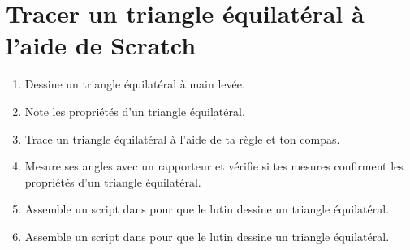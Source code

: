 \def\assignmentNameWidth{6cm}
\def\imgPath{enseignement/6e/geometrie-plane/frises/}




\section{Tracer un triangle équilatéral à l'aide de Scratch} 

\begin{enumerate}
    \item Dessine un triangle équilatéral à main levée.
    \item Note les propriétés d'un triangle équilatéral.
    \item Trace un triangle équilatéral à l'aide de ta règle et ton compas.
    \item Mesure ses angles avec un rapporteur et vérifie si tes mesures confirment les propriétés d'un triangle équilatéral.
    \item Assemble un script dans \Scratch{} pour que le lutin dessine un triangle équilatéral.
    \item Assemble un script dans \Scratch{} pour que le lutin dessine un triangle équilatéral. 
    
\end{enumerate}

